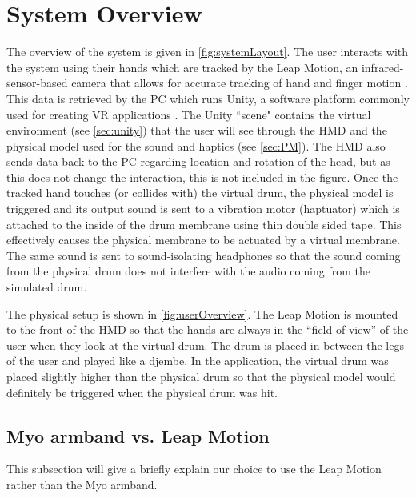\documentclass{vgtc}
\begin{document}
\section{System Overview} \label{sec:sys}
The overview of the system is given in \autoref{fig:systemLayout}. The user interacts with the system using their hands which are tracked by the Leap Motion, an infrared-sensor-based camera that allows for accurate tracking of hand and finger motion \cite{leapwebsite}. This data is retrieved by the PC which runs Unity, a software platform commonly used for creating VR applications \cite{unity}. The Unity ``scene" contains the virtual environment (see \autoref{sec:unity}) that the user will see through the HMD and the physical model used for the sound and haptics (see \autoref{sec:PM}). The HMD also sends data back to the PC regarding location and rotation of the head, but as this does not change the interaction, this is not included in the figure. Once the tracked hand touches (or collides with) the virtual drum, the physical model is triggered and its output sound is sent to a vibration motor (haptuator) which is attached to the inside of the drum membrane using thin double sided tape. This effectively causes the physical membrane to be actuated by a virtual membrane. The same sound is sent to sound-isolating headphones so that the sound coming from the physical drum does not interfere with the audio coming from the simulated drum.

The physical setup is shown in \autoref{fig:userOverview}. The Leap Motion is mounted to the front of the HMD so that the hands are always in the ``field of view'' of the user when they look at the virtual drum. The drum is placed in between the legs of the user and played like a djembe. In the application, the virtual drum was placed slightly higher than the physical drum so that the physical model would definitely be triggered when the physical drum was hit.
\subsection{Myo armband vs. Leap Motion}
This subsection will give a briefly explain our choice to use the Leap Motion rather than the Myo armband.
\end{document}
